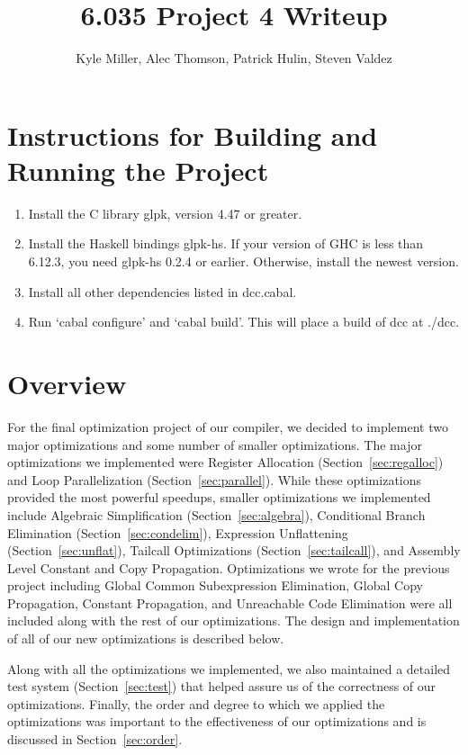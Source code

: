 \documentclass[11pt]{article}
\title{6.035 Project 4 Writeup}
\author{Kyle Miller, Alec Thomson, Patrick Hulin, Steven Valdez}
\begin{document}
\maketitle

\section {Instructions for Building and Running the Project}
\begin{enumerate}
\item Install the C library glpk, version 4.47 or greater.
\item Install the Haskell bindings glpk-hs. If your version of GHC is
less than 6.12.3, you need glpk-hs 0.2.4 or earlier.  Otherwise,
install the newest version.
\item Install all other dependencies listed in dcc.cabal.
\item Run `cabal configure' and `cabal build'. This will place a build
of dcc at ./dcc.
\end{enumerate}


\section {Overview}

For the final optimization project of our compiler, we decided to
implement two major optimizations and some number of smaller
optimizations. The major optimizations we implemented were Register
Allocation (Section~\ref{sec:regalloc}) and Loop Parallelization
(Section~\ref{sec:parallel}). While these optimizations provided the
most powerful speedups, smaller optimizations we implemented include
Algebraic Simplification (Section~\ref{sec:algebra}), Conditional
Branch Elimination (Section~\ref{sec:condelim}), Expression
Unflattening (Section~\ref{sec:unflat}), Tailcall
Optimizations (Section~\ref{sec:tailcall}), and Assembly Level
Constant and Copy Propagation. Optimizations we wrote for the previous
project including Global Common Subexpression Elimination, Global Copy
Propagation, Constant Propagation, and Unreachable Code Elimination
were all included along with the rest of our optimizations. The design
and implementation of all of our new optimizations is described
below. 

Along with all the optimizations we implemented, we also maintained a
detailed test system (Section~\ref{sec:test}) that helped assure us
of the correctness of our optimizations. Finally, the order and degree
to which we applied the optimizations was important to the
effectiveness of our optimizations and is discussed in Section~\ref{sec:order}.
\end{document}
